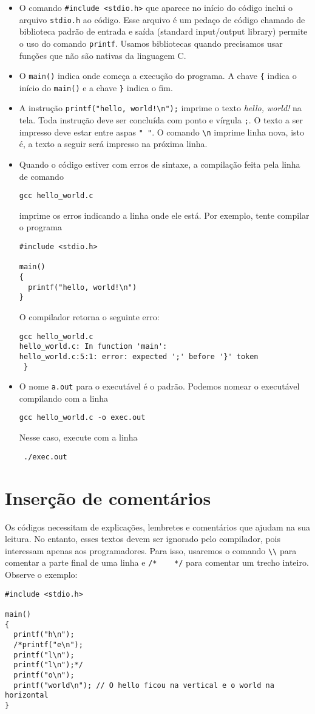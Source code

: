 \begin{itemize}
 \item O comando \verb|#include <stdio.h>| que aparece no início do código inclui o arquivo \verb|stdio.h| ao código. Esse arquivo é um pedaço de código chamado de biblioteca padrão de entrada e saída (standard input/output library) permite o uso do comando \verb|printf|. Usamos bibliotecas quando precisamos usar funções que não são nativas da linguagem C.
 \item O \verb|main()| indica onde começa a execução do programa. A chave \verb|{| indica o início do \verb|main()| e a chave \verb|}| indica o fim. 
 \item A instrução \verb|printf("hello, world!\n");| imprime o texto {\it hello, world!} na tela. Toda instrução deve ser concluída com ponto e vírgula \verb|;|. O texto a ser impresso deve estar entre aspas \verb|" "|. O comando \verb|\n| imprime linha nova, isto é, a texto a seguir será impresso na próxima linha.
 \item Quando o código estiver com erros de sintaxe, a compilação feita pela linha de comando 
\begin{verbatim}
gcc hello_world.c
\end{verbatim}
imprime os erros indicando a linha onde ele está. Por exemplo, tente compilar o programa
 \begin{verbatim}
#include <stdio.h>

main()
{
  printf("hello, world!\n")
}
\end{verbatim}
O compilador retorna o seguinte erro:
\begin{verbatim}
gcc hello_world.c 
hello_world.c: In function 'main':
hello_world.c:5:1: error: expected ';' before '}' token
 }
\end{verbatim}

\item O nome \verb|a.out| para o executável é o padrão. Podemos nomear o executável compilando com a linha 
\begin{verbatim}
gcc hello_world.c -o exec.out 
\end{verbatim}
Nesse caso, execute com a linha 
\begin{verbatim}
 ./exec.out
\end{verbatim} 
\end{itemize}

\section{Inserção de comentários}
Os códigos necessitam de explicações, lembretes e comentários que ajudam na sua leitura. No entanto, esses textos devem ser ignorado pelo compilador, pois interessam apenas aos programadores. Para isso, usaremos o comando \verb|\\| para comentar a parte final de uma linha e \verb|/*    */| para comentar um trecho inteiro. Observe o exemplo:
 \begin{verbatim}
#include <stdio.h>

main()
{
  printf("h\n");
  /*printf("e\n");
  printf("l\n");
  printf("l\n");*/
  printf("o\n");
  printf("world\n"); // O hello ficou na vertical e o world na horizontal
}
\end{verbatim}

